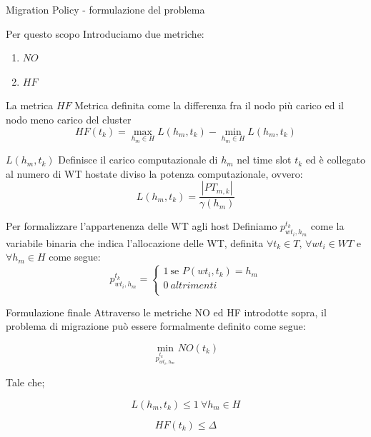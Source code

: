 \documentclass{beamer}
\begin{document}
\begin{frame}[allowframebreaks]{Migration Policy - formulazione del problema}
 	 \begin{block}{Per questo scopo}
 	 	Introduciamo due metriche:
 	 	\begin{enumerate}
 	 		\item $NO$
 	 		\item $HF$
 	 	\end{enumerate}
 	 \end{block}
  
   \begin{block}{La metrica $HF$}
  	Metrica definita come la differenza fra il nodo più carico ed il nodo meno carico del cluster
		\[
		HF(t_k) = \max_{h_m \in H} L(h_m, t_k) - \min_{h_m \in H} L(h_m, t_k)
		\]
  \end{block}
  \begin{block}{$L(h_m, t_k)$}
  	 Definisce il carico computazionale di $h_m$ nel time slot $t_k$ ed è collegato al numero di WT hostate diviso la potenza computazionale, ovvero:
  	\[
  	L(h_m, t_k) = \frac{|PT_{m,k}|}{\gamma(h_m)}
  	\]
  \end{block}

   \pagebreak
  
  \begin{block}{Per formalizzare l'appartenenza delle WT agli host}
  			Definiamo $p^{t_k}_{wt_i, h_m}$ come la variabile binaria che indica l'allocazione delle WT, definita $\forall t_k \in T$, $\forall wt_i \in WT$ e $\forall h_m \in H$ come segue:
  	\[
  	p^{t_k}_{wt_i, h_m} =
  	\begin{cases}
  		1 \ \text{se } P(wt_i, t_k) = h_m\\
  		0 \ \textit{altrimenti}\\
  	\end{cases}
  	\]
  \end{block}

  \pagebreak
  
  \begin{block}{Formulazione finale}
  Attraverso le metriche NO ed HF introdotte sopra, il problema di migrazione può essere formalmente definito come segue:
  
  \[
  \min_{p^{t_k}_{wt_i, h_m}} NO(t_k)
  \]
  
  Tale che;
 
  \[
  L(h_m, t_k) \le 1 \ \forall h_m \in H 
  \]
  
  \[
  HF(t_k) \le \Delta
  \]
  \end{block}
	
\end{frame}
\end{document}
